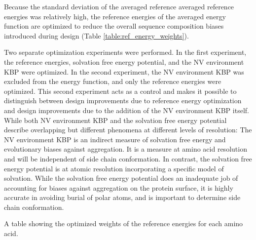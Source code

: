 Because the standard deviation of the averaged reference averaged reference energies was relatively high, the reference energies of the averaged energy function are optimized to reduce the overall sequence composition biases introduced during design (Table \ref{table:ref_energy_weights}).

Two separate optimization experiments were performed.
In the first experiment, the reference energies, solvation free energy potential, and the \ac{NV} environment \ac{KBP} were optimized.
In the second experiment, the \ac{NV} environment \ac{KBP} was excluded from the energy function, and only the reference energies were optimized.
This second experiment acts as a control and makes it possible to distinguish between design improvements due to reference energy optimization and design improvements due to the addition of the \ac{NV} environment \ac{KBP} itself.
While both \ac{NV} environment \ac{KBP} and the solvation free energy potential describe overlapping but different phenomena at different levels of resolution: The \ac{NV} environment \ac{KBP} is an indirect measure of solvation free energy and evolutionary biases against aggregation.
It is a measure at amino acid resolution and will be independent of side chain conformation.
In contrast, the solvation free energy potential is at atomic resolution incorporating a specific model of solvation.
While the solvation free energy potential does an inadequate job of accounting for biases against aggregation on the protein surface, it is highly accurate in avoiding burial of polar atoms, and is important to determine side chain conformation.

\begin{table}
\scriptsize
\renewcommand{\tabcolsep}{0.09cm}
\centering

\caption{A table showing the optimized weights of the reference energies for each amino acid. }
\label{table:ref_energy_weights}
\end{table}


